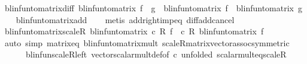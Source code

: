 \begin{isabellebody}
\endisatagproof
{\isafoldproof}%
%
\isadelimproof
\isanewline
%
\endisadelimproof
\isanewline
{}\isamarkupfalse%
\ blinfun{\isacharunderscore}{\kern0pt}to{\isacharunderscore}{\kern0pt}matrix{\isacharunderscore}{\kern0pt}diff{\isacharcolon}{\kern0pt}\ {\isachardoublequoteopen}blinfun{\isacharunderscore}{\kern0pt}to{\isacharunderscore}{\kern0pt}matrix\ {\isacharparenleft}{\kern0pt}f\ {\isacharminus}{\kern0pt}\ g{\isacharparenright}{\kern0pt}\ {\isacharequal}{\kern0pt}\ blinfun{\isacharunderscore}{\kern0pt}to{\isacharunderscore}{\kern0pt}matrix\ f\ {\isacharminus}{\kern0pt}\ blinfun{\isacharunderscore}{\kern0pt}to{\isacharunderscore}{\kern0pt}matrix\ g{\isachardoublequoteclose}\isanewline
%
\isadelimproof
\ \ %
\endisadelimproof
%
\isatagproof
{}\isamarkupfalse%
\ blinfun{\isacharunderscore}{\kern0pt}to{\isacharunderscore}{\kern0pt}matrix{\isacharunderscore}{\kern0pt}add\isanewline
\ \ \isamarkupfalse%
\ {\isacharparenleft}{\kern0pt}metis\ add{\isacharunderscore}{\kern0pt}right{\isacharunderscore}{\kern0pt}imp{\isacharunderscore}{\kern0pt}eq\ diff{\isacharunderscore}{\kern0pt}add{\isacharunderscore}{\kern0pt}cancel{\isacharparenright}{\kern0pt}%
\endisatagproof
{\isafoldproof}%
%
\isadelimproof
\isanewline
%
\endisadelimproof
\isanewline
{}\isamarkupfalse%
\ blinfun{\isacharunderscore}{\kern0pt}to{\isacharunderscore}{\kern0pt}matrix{\isacharunderscore}{\kern0pt}scaleR{\isacharcolon}{\kern0pt}\ {\isachardoublequoteopen}blinfun{\isacharunderscore}{\kern0pt}to{\isacharunderscore}{\kern0pt}matrix\ {\isacharparenleft}{\kern0pt}c\ {\isacharasterisk}{\kern0pt}\isactrlsub R\ f{\isacharparenright}{\kern0pt}\ {\isacharequal}{\kern0pt}\ c\ {\isacharasterisk}{\kern0pt}\isactrlsub R\ blinfun{\isacharunderscore}{\kern0pt}to{\isacharunderscore}{\kern0pt}matrix\ f{\isachardoublequoteclose}\isanewline
%
\isadelimproof
\ \ %
\endisadelimproof
%
\isatagproof
{}\isamarkupfalse%
\ {\isacharparenleft}{\kern0pt}auto\ simp{\isacharcolon}{\kern0pt}\ matrix{\isacharunderscore}{\kern0pt}eq\ blinfun{\isacharunderscore}{\kern0pt}to{\isacharunderscore}{\kern0pt}matrix{\isacharunderscore}{\kern0pt}mult{\isacharprime}{\kern0pt}{\isacharprime}{\kern0pt}\ scaleR{\isacharunderscore}{\kern0pt}matrix{\isacharunderscore}{\kern0pt}vector{\isacharunderscore}{\kern0pt}assoc{\isacharbrackleft}{\kern0pt}symmetric{\isacharbrackright}{\kern0pt}\ \isanewline
\ \ \ \ \ \ blinfun{\isachardot}{\kern0pt}scaleR{\isacharunderscore}{\kern0pt}left\ vector{\isacharunderscore}{\kern0pt}scalar{\isacharunderscore}{\kern0pt}mult{\isacharunderscore}{\kern0pt}def{\isacharbrackleft}{\kern0pt}of\ c{\isacharcomma}{\kern0pt}\ unfolded\ scalar{\isacharunderscore}{\kern0pt}mult{\isacharunderscore}{\kern0pt}eq{\isacharunderscore}{\kern0pt}scaleR{\isacharbrackright}{\kern0pt}{\isacharparenright}{\kern0pt}%

\end{isabellebody}
